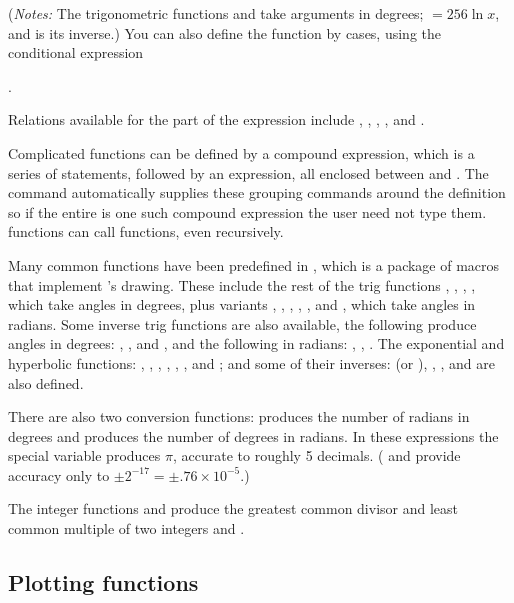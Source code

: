 \documentclass[letterpaper]{article}
\begin{document}
(\textit{Notes:} The \MF{} trigonometric functions  and
 take arguments in degrees; $=256\ln x$, and
 is its inverse.) You can also define the function 
by cases, using the \MF{} conditional expression
\begin{ex}
  .
\end{ex}
Relations available for the  part of the expression
include \mfc{=}, \mfc{<}, \mfc{>}, \mfc{<=}, \mfc{<>} and \mfc{>=}.

Complicated functions can be defined by a compound expression, which is
a series of \MF{} statements, followed by an expression, all enclosed
between  and . The  command
automatically supplies these grouping commands around the definition so
if the entire  is one such compound expression the user
need not type them. \CMF{} functions can call \MF{} functions, even
recursively.

Many common functions have been predefined in , which is
a package of \MF{} macros that implement 's drawing. These
include the rest of the trig functions , , ,
, which take angles in degrees, plus variants ,
, , , , and , which take
angles in radians. Some inverse trig functions are also available, the
following produce angles in degrees: , , and
, and the following in radians: , ,
. The exponential and hyperbolic functions: ,
, , , , , and
; and some of their inverses:  (or ),
, , and  are also defined.

There are also two conversion functions:  produces the
number of radians in  degrees and  produces the
number of degrees in  radians. In these expressions the special
variable  produces $\pi$, accurate to roughly 5 decimals.
(\CMF{} and \MP{} provide accuracy only to $\pm2^{-17} = \pm
.76\times10^{-5}$.)

The integer functions  and  produce the
greatest common divisor and least common multiple of two integers
 and .


\subsection{Plotting functions}\label{plotting}
\end{document}
